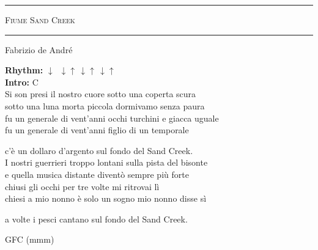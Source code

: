 \documentclass[10pt, twoside, a4paper]{article}
\begin{document}
\begin{center}

	\hrule \vspace{0.2cm}
     	\textsc{\LARGE Fiume Sand Creek}
	\vspace{0.2cm} \hrule \vspace{0.2cm}
      	{\large Fabrizio de Andr\'e}
      	
\end{center}


		
\textbf{Rhythm:} $ \downarrow \,\,\, \downarrow\uparrow \, \downarrow\uparrow \, \downarrow\uparrow$\\

\textbf{Intro:} C\\

Si son presi il nostro cuore sotto una coperta scura\\
sotto una luna morta piccola dormivamo senza paura\\
fu un generale di vent'anni occhi turchini e giacca uguale\\
fu un generale di vent'anni figlio di un temporale

\hspace{24pt} c'\`e un dollaro d'argento sul fondo del Sand Creek.\\

I nostri guerrieri troppo lontani sulla pista del bisonte\\
e quella musica distante divent\`o sempre pi\`u forte\\
chiusi gli occhi per tre volte mi ritrovai l\`i\\
chiesi a mio nonno \`e solo un sogno mio nonno disse s\`i

\hspace{24pt} a volte i pesci cantano sul fondo del Sand Creek.

\hspace{48pt} G\hspace{36pt}F\hspace{18pt}C\hspace{24pt} (mmm)\\
\end{document}
